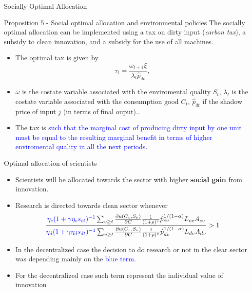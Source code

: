 \documentclass[aspectratio=169,xcolor=dvipsnames]{beamer}
\begin{document}
\begin{frame}{Socially Optimal Allocation}
    \begin{block}{Proposition 5 - Social optimal allocation and environmental policies}
    The socially optimal allocation can be implemented using a tax on dirty input (\textit{carbon tax}), a subsidy to clean innovation, and a subsidy for the use of all machines.
    \end{block}
    \begin{itemize}
        \item The optimal tax is given by
        \begin{equation*}
            \tau_t = \frac{\omega_{t+1} \xi}{\lambda_t \hat{p}_{dt}},
        \end{equation*}
    \item $\omega$ is the costate variable associated with the enviromental quality $S_t$, $\lambda_t$ is the costate variable associated with the consumption good $C_t$, $\hat{p}_{dt}$ if the shadow price of input $j$ (in terms of final ouput)..
    \item The tax is \textcolor{blue}{such that the marginal cost of producing dirty input by one unit must be equal to the resulting marginal benefit in terms of higher enviromental quality in all the next periods}. 
\end{itemize}
\end{frame}

\begin{frame}{Optimal allocation of scientists}
    \begin{itemize}
        \item Scientists will be allocated towards the sector with higher \textbf{social gain} from innovation.
        \item Research is directed towards clean sector whenever
        \begin{equation*}
            \frac{\textcolor{blue}{\eta_c (1 + \gamma \eta_c s_{ct})^{-1}} \sum_{v \ge t} \frac{\partial u(C_v, S_v)}{\partial C} \frac{1}{(1 + \rho)^v} \hat{p}_{cv}^{1/(1-\alpha)} L_{cv} A_{cv}}{ \textcolor{blue}{\eta_d (1 + \gamma \eta_d s_{dt})^{-1}} \sum_{v \ge t} \frac{\partial u(C_v, S_v)}{\partial C} \frac{1}{(1 + \rho)^v} \hat{p}_{dv}^{1/(1-\alpha)} L_{dv} A_{dv}} > 1
        \end{equation*}
        \item In the decentralized case the decision to do research or not in the clear sector was depending mainly on the \textcolor{blue}{blue term}.
        \item For the decentralized case such term represent the individual value of innovation
    \end{itemize}
\end{frame}
\end{document}
